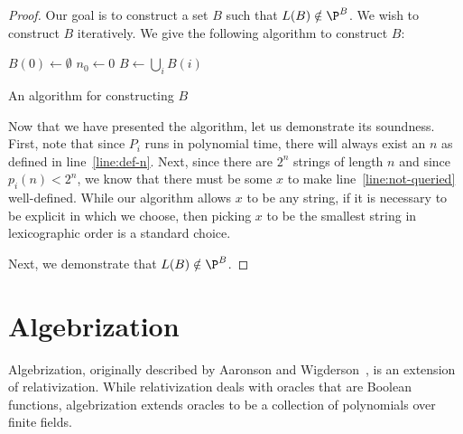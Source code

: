 \begin{proof}
  Our goal is to construct a set $B$ such that $L(B) \notin \P^{B}$. We wish to
  construct $B$ iteratively. We give the following algorithm to construct $B$:

  \begin{algorithm}[H]
    $B(0) \leftarrow \emptyset$\;
    $n_{0} \leftarrow 0$\;
    $B \leftarrow \bigcup_{i}B(i)$\;
    \caption{An algorithm for constructing $B$}\label{alg:construct-b}
  \end{algorithm}

  Now that we have presented the algorithm, let us demonstrate its soundness.
  First, note that since $P_{i}$ runs in polynomial time, there will always
  exist an $n$ as defined in line~\ref{line:def-n}. Next, since there are
  $2^{n}$ strings of length $n$ and since $p_{i}(n) < 2^{n}$, we know that there
  must be some $x$ to make line~\ref{line:not-queried} well-defined. While our
  algorithm allows $x$ to be any string, if it is necessary to be explicit in
  which we choose, then picking $x$ to be the smallest string in lexicographic
  order is a standard choice.

  Next, we demonstrate that $L(B) \notin \P^{B}$.
\end{proof}

\section{Algebrization}\label{sec:algebrization}

Algebrization, originally described by Aaronson and Wigderson~\cite{AW09}, is an
extension of relativization. While relativization deals with oracles that are
Boolean functions, algebrization extends oracles to be a collection of
polynomials over finite fields.


